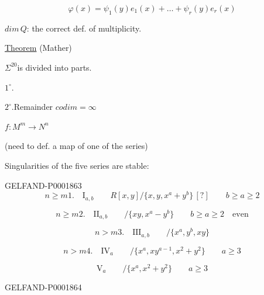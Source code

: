 \begin{equation*}\varphi (x)=\psi_1(y)e_1(x)+\ldots+\psi_r (y)e_r (x)\end{equation*}

$dim\, Q$: the correct def. of multiplicity.

\underline{Theorem} (Mather)

$\Sigma^{20}$\quad is divided into parts.

$1^\circ. $\quad{}

$2^\circ. $\quad Remainder $codim=\infty$

$f: M^m\longrightarrow N^n$

(need to def. a map of one of the series)

Singularities of the five series are stable:

\begin{GelfandAdjacentEvidence}{GELFAND-P000186}{3}
\begin{equation*}n\geq m1.\quad\mathrm{I}_{a, b}\qquad R[x, y]/\{x, y, x^a+y^b\}\, [?]\qquad b\geq a\geq2\end{equation*}
\end{GelfandAdjacentEvidence}

\begin{equation*}n\geq m2.\quad\mathrm{II}_{a, b}\qquad/\{xy, x^a-y^b\}\qquad b\geq a\geq2\quad\text{even}\end{equation*}

\begin{equation*}n>m3.\quad\mathrm{III}_{a, b}\qquad/\{x^a, y^b, xy\}\end{equation*}

\begin{equation*}n>m4.\quad\mathrm{IV}_a\qquad/\{x^a, xy^{a-1}, x^2+y^2\}\qquad a\geq3\end{equation*}

\begin{equation*}\mathrm{V}_a\qquad/\{x^a, x^2+y^2\}\qquad a\geq3\end{equation*}

\begin{GelfandAdjacentEvidence}{GELFAND-P000186}{4}
\end{GelfandAdjacentEvidence}

